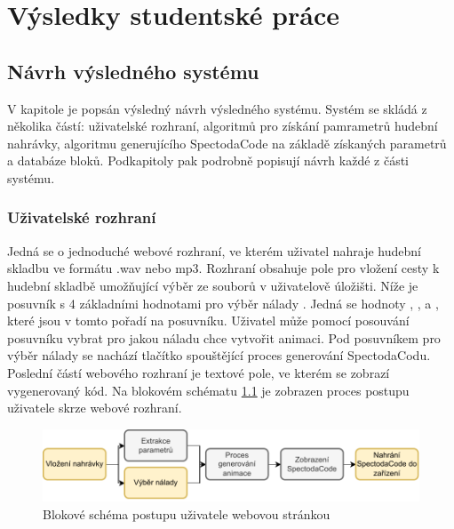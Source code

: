 \chapter{Výsledky studentské práce}



\section{Návrh výsledného systému}

V kapitole je popsán výsledný návrh výsledného systému. Systém se skládá z několika částí: uživatelské rozhraní, algoritmů pro získání pamrametrů hudební nahrávky, algoritmu generujícího SpectodaCode na základě získaných parametrů a databáze bloků. Podkapitoly pak podrobně popisují návrh každé z části systému.

\subsection{Uživatelské rozhraní} \label{sec:User_interface}

Jedná se o jednoduché webové rozhraní, ve kterém uživatel nahraje hudební skladbu ve formátu .wav nebo mp3. Rozhraní obsahuje pole pro vložení cesty k hudební skladbě umožňující výběr ze souborů v uživatelově úložišti. Níže je posuvník s 4 základními hodnotami pro výběr nálady
. Jedná se hodnoty , ,  a , které jsou v tomto pořadí na posuvníku. Uživatel může pomocí posouvání posuvníku vybrat pro jakou náladu chce vytvořit animaci. Pod posuvníkem pro výběr nálady se nachází tlačítko spouštějící proces generování SpectodaCodu.
Poslední částí webového rozhraní je textové pole, ve kterém se zobrazí vygenerovaný kód. Na blokovém schématu \ref{fig:User_interaction_diagram} je zobrazen proces postupu uživatele skrze webové rozhraní. 

 \begin{figure}[H]
    \centering
    \includegraphics[width = 1\linewidth]{obrazky/User_interaction_diagram.pdf}
    \caption{Blokové schéma postupu uživatele webovou stránkou}
    \label{fig:User_interaction_diagram}
\end{figure}

